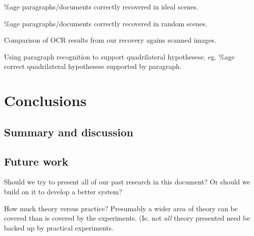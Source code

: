 \%age paragraphs/documents correctly recovered in ideal scenes.

\%age paragraphs/documents correctly recovered in random scenes.

Comparison of OCR results from our recovery agains scanned images.

Using paragraph recognition to support quadrilateral hypothesese.
eg. \%age correct quadrilateral hypothesese supported by paragraph.




\chapter{Conclusions}




\section{Summary and discussion} %



\section{Future work} %

Should we try to present all of our past research in this document?  Or should we build on it to develop a better system?

How much theory versus practice?  Presumably a wider area of theory can be covered than is covered by the experiments.  (Ie. not {\em all} theory presented need be backed up by practical experiments.



